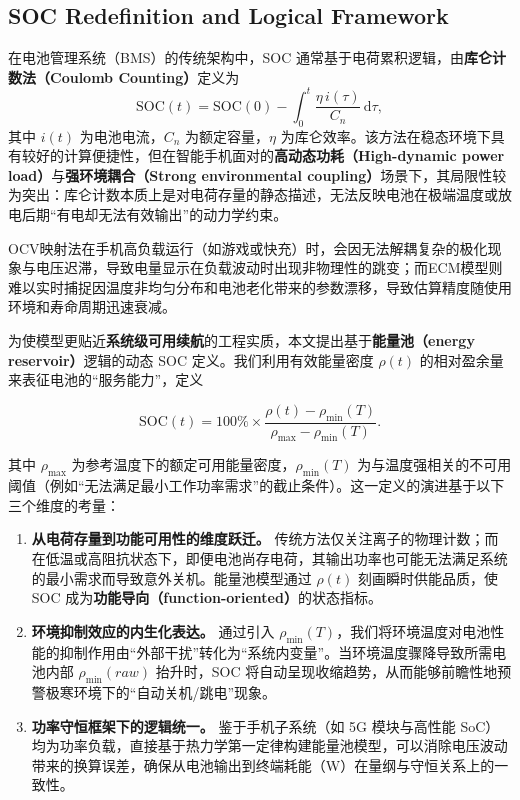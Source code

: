 \documentclass[11pt]{article}
\begin{document}
\subsection{SOC Redefinition and Logical Framework}
在电池管理系统（BMS）的传统架构中，SOC 通常基于电荷累积逻辑，由\textbf{库仑计数法（Coulomb Counting）}定义为
\begin{equation}
  \mathrm{SOC}(t)=\mathrm{SOC}(0)-\int_{0}^{t}\frac{\eta\, i(\tau)}{C_n}\,\mathrm{d}\tau,
\end{equation}
其中 $i(t)$ 为电池电流，$C_n$ 为额定容量，$\eta$ 为库仑效率。该方法在稳态环境下具有较好的计算便捷性，但在智能手机面对的\textbf{高动态功耗（High-dynamic power load）}与\textbf{强环境耦合（Strong environmental coupling）}场景下，其局限性较为突出：库仑计数本质上是对电荷存量的静态描述，无法反映电池在极端温度或放电后期“有电却无法有效输出”的动力学约束。

OCV映射法在手机高负载运行（如游戏或快充）时，会因无法解耦复杂的极化现象与电压迟滞，导致电量显示在负载波动时出现非物理性的跳变；而ECM模型则难以实时捕捉因温度非均匀分布和电池老化带来的参数漂移，导致估算精度随使用环境和寿命周期迅速衰减。

为使模型更贴近\textbf{系统级可用续航}的工程实质，本文提出基于\textbf{能量池（energy reservoir）}逻辑的动态 SOC 定义。我们利用有效能量密度 $\rho(t)$ 的相对盈余量来表征电池的“服务能力”，定义

\begin{equation}
  \mathrm{SOC}(t) = 100\% \times \frac{\rho(t) - \rho_{\min}(T)}{\rho_{\max} - \rho_{\min}(T)}.
  \label{eq:SOC}
\end{equation}

其中 $\rho_{\max}$ 为参考温度下的额定可用能量密度，$\rho_{\min}(T)$ 为与温度强相关的不可用阈值（例如“无法满足最小工作功率需求”的截止条件）。这一定义的演进基于以下三个维度的考量：
\begin{enumerate}
  \item \textbf{从电荷存量到功能可用性的维度跃迁。} 传统方法仅关注离子的物理计数；而在低温或高阻抗状态下，即便电池尚存电荷，其输出功率也可能无法满足系统的最小需求而导致意外关机。能量池模型通过 $\rho(t)$ 刻画瞬时供能品质，使 SOC 成为\textbf{功能导向（function-oriented）}的状态指标。

  \item \textbf{环境抑制效应的内生化表达。} 通过引入 $\rho_{\min}(T)$，我们将环境温度对电池性能的抑制作用由“外部干扰”转化为“系统内变量”。当环境温度骤降导致所需电池内部 $\rho_{\min}(raw)$ 抬升时，SOC 将自动呈现收缩趋势，从而能够前瞻性地预警极寒环境下的“自动关机/跳电”现象。

  \item \textbf{功率守恒框架下的逻辑统一。} 鉴于手机子系统（如 5G 模块与高性能 SoC）均为功率负载，直接基于热力学第一定律构建能量池模型，可以消除电压波动带来的换算误差，确保从电池输出到终端耗能（W）在量纲与守恒关系上的一致性。
\end{enumerate}
\end{document}
